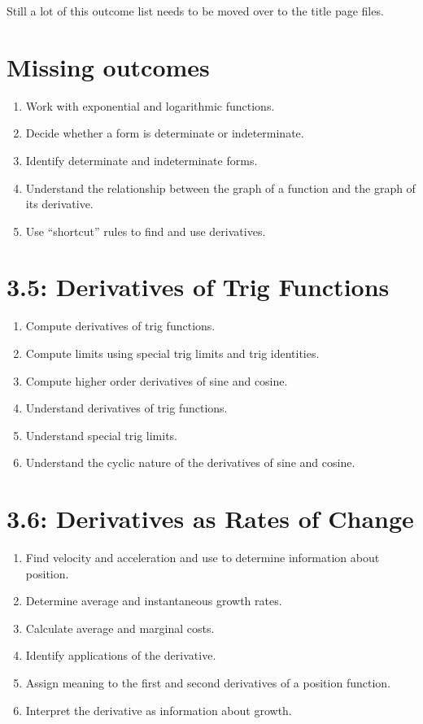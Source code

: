 Still a lot of this outcome list needs to be moved over to the title page files.

\section{Missing outcomes}
\begin{enumerate}
\item Work with exponential and logarithmic functions.
\item Decide whether a form is determinate or indeterminate.
\item Identify determinate and indeterminate forms.
\item Understand the relationship between the graph of a function and the graph of its derivative.
\item Use ``shortcut'' rules to find and use derivatives.
\end{enumerate}


\section*{3.5: Derivatives of Trig Functions}
\begin{enumerate}
	\item Compute derivatives of trig functions.
	\item Compute limits using special trig limits and trig identities.
	\item Compute higher order derivatives of sine and cosine.
	\item Understand derivatives of trig functions.
	\item Understand special trig limits.
	\item Understand the cyclic nature of the derivatives of sine and cosine.
\end{enumerate}

\section*{3.6: Derivatives as Rates of Change}
\begin{enumerate}
	\item Find velocity and acceleration and use to determine information about position.
	\item Determine average and instantaneous growth rates.
	\item Calculate average and marginal costs.
	\item Identify applications of the derivative.
	\item Assign meaning to the first and second derivatives of a position function.
	\item Interpret the derivative as information about growth.
\end{enumerate}



